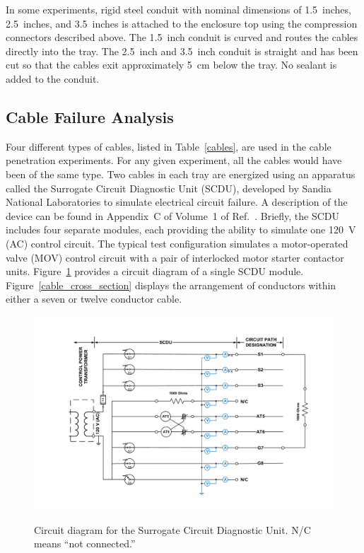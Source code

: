 In some experiments, rigid steel conduit with nominal dimensions of 1.5~inches, 2.5~inches, and 3.5~inches is attached to the enclosure top using the compression connectors described above. The 1.5~inch conduit is curved and routes the cables directly into the tray. The 2.5~inch and 3.5~inch conduit is straight and has been cut so that the cables exit approximately 5~cm below the tray. No sealant is added to the conduit.

\FloatBarrier

\subsection{Cable Failure Analysis}

Four different types of cables, listed in Table~\ref{cables}, are used in the cable penetration experiments. For any given experiment, all the cables would have been of the same type. Two cables in each tray are energized using an apparatus called the Surrogate Circuit Diagnostic Unit (SCDU), developed by Sandia National Laboratories to simulate electrical circuit failure. A description of the device can be found in Appendix~C of Volume~1 of Ref.~\cite{CAROLFIRE}. Briefly, the SCDU includes four separate modules, each providing the ability to simulate one 120~V (AC) control circuit. The typical test configuration simulates a motor-operated valve (MOV) control circuit with a pair of interlocked motor starter contactor units. Figure~\ref{circuit_diagram} provides a circuit diagram of a single SCDU module. Figure~\ref{cable_cross_section} displays the arrangement of conductors within either a seven or twelve conductor cable.

\begin{figure}[ht]
\vspace{-.4in}
\includegraphics[width=6.5in]{../FIGURES/Circuit_Drawing} \\
\vspace{-.5in}
\caption[Circuit diagram for the Surrogate Circuit Diagnostic Unit]{Circuit diagram for the Surrogate Circuit Diagnostic Unit. N/C means ``not connected.''}
\label{circuit_diagram}
\end{figure}

